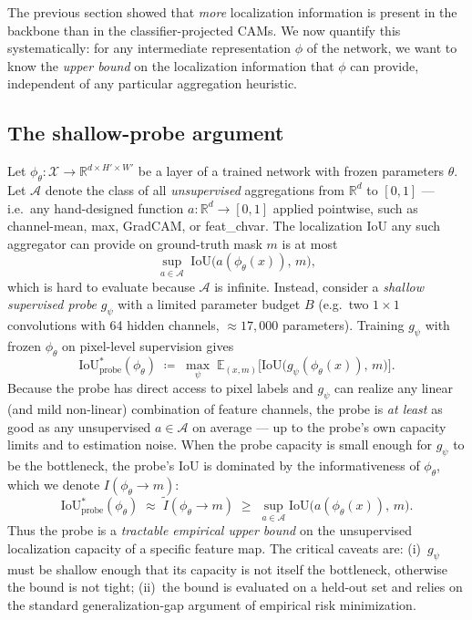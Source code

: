 \documentclass[11pt,a4paper]{article}
\newcommand{\IoU}{\mathrm{IoU}}
\begin{document}
The previous section showed that \emph{more} localization information
is present in the backbone than in the classifier-projected CAMs. We now
quantify this systematically: for any intermediate representation $\phi$
of the network, we want to know the \emph{upper bound} on the
localization information that $\phi$ can provide, independent of any
particular aggregation heuristic.

\subsection{The shallow-probe argument}

Let $\phi_\theta:\mathcal{X}\to\mathbb{R}^{d\times H'\!\times\! W'}$ be
a layer of a trained network with frozen parameters $\theta$. Let
$\mathcal{A}$ denote the class of all \emph{unsupervised} aggregations
from $\mathbb{R}^{d}$ to $[0,1]$ — i.e.\ any hand-designed function
$a:\mathbb{R}^d\!\to\![0,1]$ applied pointwise, such as channel-mean,
max, GradCAM, or feat\_chvar. The localization IoU any such aggregator
can provide on ground-truth mask $m$ is at most
\begin{equation}
\sup_{a\in\mathcal{A}}\;\IoU\!\bigl(a(\phi_\theta(x)),\,m\bigr),
\label{eq:unsup_bound}
\end{equation}
which is hard to evaluate because $\mathcal{A}$ is infinite. Instead,
consider a \emph{shallow supervised probe} $g_\psi$ with a limited
parameter budget $B$ (e.g.\ two $1{\times}1$ convolutions with 64 hidden
channels, $\approx\!17{,}000$ parameters). Training $g_\psi$ with frozen
$\phi_\theta$ on pixel-level supervision gives
\begin{equation}
\IoU^{*}_{\mathrm{probe}}(\phi_\theta) \;\coloneqq\;
\max_{\psi}\;\mathbb{E}_{(x,m)}\!\bigl[\IoU\!\bigl(g_\psi(\phi_\theta(x)),\,m\bigr)\bigr].
\label{eq:probe_def}
\end{equation}
Because the probe has direct access to pixel labels and $g_\psi$ can
realize any linear (and mild non-linear) combination of feature
channels, the probe is \emph{at least} as good as any unsupervised
$a\in\mathcal{A}$ on average — up to the probe's own capacity limits
and to estimation noise. When the probe capacity is small enough for
$g_\psi$ to be the bottleneck, the probe's IoU is dominated by the
informativeness of $\phi_\theta$, which we denote
$I(\phi_\theta\!\to\! m)$:
\begin{equation}
\IoU^{*}_{\mathrm{probe}}(\phi_\theta)
\;\approx\;\tilde I(\phi_\theta\!\to\! m)
\;\geq\;\sup_{a\in\mathcal{A}}\IoU\!\bigl(a(\phi_\theta(x)),\,m\bigr).
\end{equation}
Thus the probe is a \emph{tractable empirical upper bound} on the
unsupervised localization capacity of a specific feature map. The
critical caveats are:
(i)~$g_\psi$ must be shallow enough that its capacity is not
itself the bottleneck, otherwise the bound is not tight;
(ii)~the bound is evaluated on a held-out set and relies on the
standard generalization-gap argument of empirical risk minimization.
\end{document}
